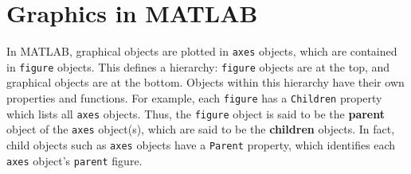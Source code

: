 \section{Graphics in MATLAB}

In MATLAB, graphical objects are plotted in \texttt{axes} objects, which are contained in \texttt{figure} objects. This defines a hierarchy: \texttt{figure} objects are at the top, and graphical objects are at the bottom. Objects within this hierarchy have their own properties and functions. For example, each \texttt{figure} has a \texttt{Children} property which lists all \texttt{axes} objects. Thus, the \texttt{figure} object is said to be the \textbf{parent} object of the \texttt{axes} object(s), which are said to be the \textbf{children} objects. In fact, child objects such as \texttt{axes} objects have a \texttt{Parent} property, which identifies each \texttt{axes} object's \texttt{parent} figure.

